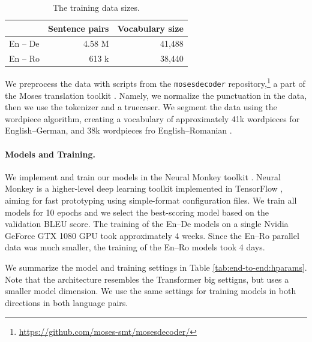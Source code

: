 \begin{table}
  \centering
  \begin{tabular}{lrr}
    \toprule
     & Sentence pairs & Vocabulary size \\
    \midrule
    En -- De & 4.58 M & 41,488 \\
    En -- Ro & 613 k & 38,440 \\
    \bottomrule
  \end{tabular}

  \caption{The training data sizes. }%
  \label{tab:end-to-end:data}
\end{table}

We preprocess the data with scripts from the \texttt{mosesdecoder}
repository,\footnote{\url{https://github.com/moses-smt/mosesdecoder/}} a part
of the Moses translation toolkit \citep{koehn-etal-2007-moses}. Namely, we
normalize the punctuation in the data, then we use the tokenizer and a
truecaser. We segment the data using the wordpiece algorithm, creating a
vocabulary of approximately 41k wordpieces for English--German, and 38k
wordpieces fro English--Romanian \citep{wu2016google}.

\paragraph{Models and Training.}
We implement and train our models in the Neural Monkey toolkit
\citep{helcl-libovicky-2017-neural,helcl-etal-2018-neural}. Neural Monkey is a
higher-level deep learning toolkit implemented in TensorFlow
\citep{tensorflow2015-whitepaper}, aiming for fast prototyping using
simple-format configuration files. We train all models for 10 epochs and we
select the best-scoring model based on the validation BLEU score. The training
of the En--De models on a single Nvidia GeForce GTX 1080 GPU took approximately
4 weeks. Since the En--Ro parallel data was much smaller, the training of the
En--Ro models took 4 days.

We summarize the model and training settings in Table
\ref{tab:end-to-end:hparams}. Note that the architecture resembles the
Transformer big settigns, but uses a smaller model dimension. We use the same
settings for training models in both directions in both language pairs.

